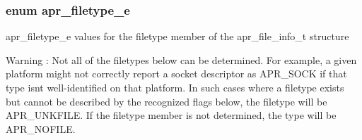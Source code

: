 \subsubsection[{\texorpdfstring{apr\+\_\+filetype\+\_\+e}{apr_filetype_e}}]{\setlength{\rightskip}{0pt plus 5cm}enum {\bf apr\+\_\+filetype\+\_\+e}}\hypertarget{group__apr__file__info_gae3f0ce3014337a52b39852f8bf81ca7c}{}\label{group__apr__file__info_gae3f0ce3014337a52b39852f8bf81ca7c}
apr\+\_\+filetype\+\_\+e values for the filetype member of the apr\+\_\+file\+\_\+info\+\_\+t structure \begin{DoxyWarning}{Warning}
\+: Not all of the filetypes below can be determined. For example, a given platform might not correctly report a socket descriptor as A\+P\+R\+\_\+\+S\+O\+CK if that type isn\textquotesingle{}t well-\/identified on that platform. In such cases where a filetype exists but cannot be described by the recognized flags below, the filetype will be A\+P\+R\+\_\+\+U\+N\+K\+F\+I\+LE. If the filetype member is not determined, the type will be A\+P\+R\+\_\+\+N\+O\+F\+I\+LE. 
\end{DoxyWarning}
